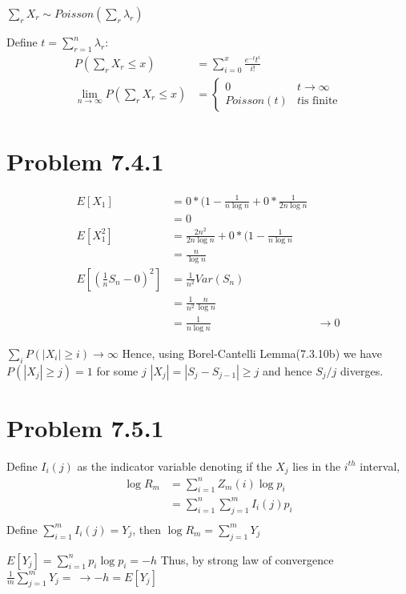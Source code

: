 \documentclass[a4paper]{article}
\begin{document}
$\sum_r X_r \sim Poisson(\sum_r \lambda_r)$

Define $t=\sum_{r=1}^n \lambda_r$:
\begin{align*}
P(\sum_r X_r \leq x) &= \sum_{i=0}^x \frac{e^{-t}t^i}{i!}\\
\lim_{n \longrightarrow \infty}P(\sum_r X_r \leq x)  &= \begin{cases} 0 & t\longrightarrow \infty\\
Poisson(t) & t \text{is finite}
\end{cases}
\end{align*}

\section*{Problem 7.4.1}

\begin{align*}
E[X_1] &= 0*(1-\frac{1}{n\log{n}} + 0*\frac{1}{2n\log n}\\
&=0\\
E[X_1^2] &= \frac{2n^2}{2n\log{n}}+0*(1-\frac{1}{n\log{n}}\\
&= \frac{n}{\log{n}}\\
E[(\frac{1}{n}S_n-0)^2] &= \frac{1}{n^2}Var(S_n)\\
&= \frac{1}{n^2}\frac{n}{\log{n}}\\
&= \frac{1}{n \log{n}}
&\longrightarrow 0
\end{align*}

$\sum_i P(|X_i| \geq i) 
\longrightarrow \infty$ Hence, using Borel-Cantelli Lemma(7.3.10b)
we have $P(|X_j| \geq j) =1$ for some $j$
$|X_j| = |S_j-S_{j-1}| \geq j$ and hence $S_j/j$ diverges.


\section*{Problem 7.5.1}
Define $I_{i}(j)$ as the indicator variable denoting if the $X_j$ lies in the $i^{th}$ interval,
\begin{align*}
\log{R_m} &= \sum_{i=1}^n Z_m(i) \log p_i\\
&= \sum_{i=1}^n \sum_{j=1}^m I_i(j) p_i\\
\end{align*}
Define $\sum_{i=1}^m I_i(j)=Y_j$, then $\log{R_m} = \sum_{j=1}^m Y_j$ 

$E[Y_j]=\sum_{i=1}^np_i\log{p_i}=-h$
Thus, by strong law of convergence $\frac{1}{m}\sum_{j=1}^m Y_j = \ \longrightarrow -h=E[Y_j]$
\end{document}
